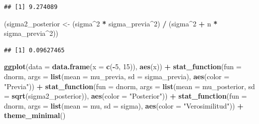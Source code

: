 \documentclass[
  12pt,
]{book}
\newenvironment{Shaded}{\begin{snugshade}}{\end{snugshade}}
\newcommand{\DataTypeTok}[1]{\textcolor[rgb]{0.13,0.29,0.53}{#1}}
\newcommand{\DecValTok}[1]{\textcolor[rgb]{0.00,0.00,0.81}{#1}}
\newcommand{\KeywordTok}[1]{\textcolor[rgb]{0.13,0.29,0.53}{\textbf{#1}}}
\newcommand{\NormalTok}[1]{#1}
\newcommand{\OperatorTok}[1]{\textcolor[rgb]{0.81,0.36,0.00}{\textbf{#1}}}
\newcommand{\StringTok}[1]{\textcolor[rgb]{0.31,0.60,0.02}{#1}}
\begin{document}
\begin{verbatim}
## [1] 9.274089
\end{verbatim}

\begin{Shaded}
\begin{Highlighting}[]
\NormalTok{(sigma2\_posterior \textless{}{-}}\StringTok{ }\NormalTok{(sigma}\OperatorTok{\^{}}\DecValTok{2} \OperatorTok{*}\StringTok{ }\NormalTok{sigma\_previa}\OperatorTok{\^{}}\DecValTok{2}\NormalTok{) }\OperatorTok{/}\StringTok{ }\NormalTok{(sigma}\OperatorTok{\^{}}\DecValTok{2} \OperatorTok{+}\StringTok{ }\NormalTok{n }\OperatorTok{*}\StringTok{ }\NormalTok{sigma\_previa}\OperatorTok{\^{}}\DecValTok{2}\NormalTok{))}
\end{Highlighting}
\end{Shaded}

\begin{verbatim}
## [1] 0.09627465
\end{verbatim}

\begin{Shaded}
\begin{Highlighting}[]
\KeywordTok{ggplot}\NormalTok{(}\DataTypeTok{data =} \KeywordTok{data.frame}\NormalTok{(}\DataTypeTok{x =} \KeywordTok{c}\NormalTok{(}\OperatorTok{{-}}\DecValTok{5}\NormalTok{, }\DecValTok{15}\NormalTok{)), }\KeywordTok{aes}\NormalTok{(x)) }\OperatorTok{+}
\StringTok{  }\KeywordTok{stat\_function}\NormalTok{(}\DataTypeTok{fun =}\NormalTok{ dnorm, }\DataTypeTok{args =} \KeywordTok{list}\NormalTok{(}\DataTypeTok{mean =}\NormalTok{ mu\_previa, }\DataTypeTok{sd =}\NormalTok{ sigma\_previa), }\KeywordTok{aes}\NormalTok{(}\DataTypeTok{color =} \StringTok{"Previa"}\NormalTok{)) }\OperatorTok{+}
\StringTok{  }\KeywordTok{stat\_function}\NormalTok{(}\DataTypeTok{fun =}\NormalTok{ dnorm, }\DataTypeTok{args =} \KeywordTok{list}\NormalTok{(}\DataTypeTok{mean =}\NormalTok{ mu\_posterior, }\DataTypeTok{sd =} \KeywordTok{sqrt}\NormalTok{(sigma2\_posterior)), }\KeywordTok{aes}\NormalTok{(}\DataTypeTok{color =} \StringTok{"Posterior"}\NormalTok{)) }\OperatorTok{+}
\StringTok{  }\KeywordTok{stat\_function}\NormalTok{(}\DataTypeTok{fun =}\NormalTok{ dnorm, }\DataTypeTok{args =} \KeywordTok{list}\NormalTok{(}\DataTypeTok{mean =}\NormalTok{ mu, }\DataTypeTok{sd =}\NormalTok{ sigma), }\KeywordTok{aes}\NormalTok{(}\DataTypeTok{color =} \StringTok{"Verosimilitud"}\NormalTok{)) }\OperatorTok{+}
\StringTok{  }\KeywordTok{theme\_minimal}\NormalTok{()}
\end{Highlighting}
\end{Shaded}
\end{document}
